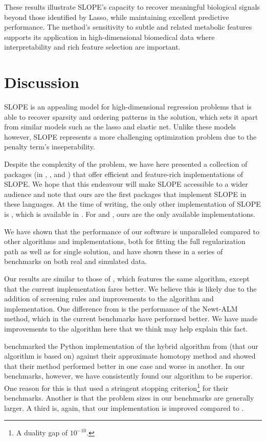 \documentclass[article]{jss}
\begin{document}
These results illustrate SLOPE’s capacity to recover meaningful biological signals beyond those identified by Lasso, while maintaining excellent predictive performance. The method’s sensitivity to subtle and related metabolic features supports its application in high-dimensional biomedical data where interpretability and rich feature selection are important.

\section{Discussion}\label{sec:discussion}

SLOPE is an appealing model for high-dimensional regression problems that is
able to recover sparsity and ordering patterns in the solution, which sets it
apart from similar models such as the lasso and elastic net. Unlike these models
however, SLOPE represents a more challenging optimization problem due to the
penalty term's inseperability.

Despite the complexity of the problem, we have here presented a collection of
packages (in , , and ) that offer
efficient and feature-rich implementations of SLOPE. We hope that this
endeavour will make SLOPE accessible to a wider audience and note that ours are
the first packages that implement SLOPE in these languages. At the time of
writing, the only other implementation of SLOPE is , which is
available in . For  and , ours are
the only available implementations.

We have shown that the performance of our software is unparalleled
compared to other algorithms and implementations, both for fitting
the full regularization path as well as for single solution, and
have shown these in a series of benchmarks on both real and simulated
data.

Our results are similar to those of \citet{larsson2023}, which features the
same algorithm, except that the current implementation fares better. We
believe this is likely due to the addition of screening rules and improvements
to the algorithm and implementation. One difference from \citet{larsson2023} is
the performance of the Newt-ALM method, which in the current benchmarks have
performed better. We have made improvements to the algorithm here that we think may
help explain this fact.

\citet{dupuis2024} benchmarked the Python implementation of the hybrid
algorithm from \citet{larsson2023} (that our algorithm is based on) against
their approximate homotopy method and showed that their method performed better
in one case and worse in another. In our benchmarks, however, we have
consistently found our algorithm to be superior. One reason for this is that
\citet{dupuis2024} used a stringent stopping criterion\footnote{A duality
  gap of \(10^{-10}\).} for their benchmarks. Another is that the problem sizes in
our benchmarks are generally larger. A third is, again, that our implementation
is improved compared to \citet{larsson2023}.
\end{document}
